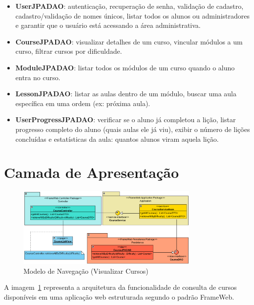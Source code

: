 \begin{itemize}
	\item \textbf{UserJPADAO}: autenticação, recuperação de senha, validação de cadastro, cadastro/validação de nomes únicos, listar todos os alunos ou administradores e garantir que o usuário está acessando a área administrativa.
	
	\item \textbf{CourseJPADAO}: visualizar detalhes de um curso, vincular módulos a um curso, filtrar cursos por dificuldade.
	
	\item \textbf{ModuleJPADAO}: listar todos os módulos de um curso quando o aluno entra no curso.
	
	\item \textbf{LessonJPADAO}: listar as aulas dentro de um módulo, buscar uma aula específica em uma ordem (ex: próxima aula).
	
	\item \textbf{UserProgressJPADAO}: verificar se o aluno já completou a lição, listar progresso completo do aluno (quais aulas ele já viu), exibir o número de lições concluídas e estatísticas da aula: quantos alunos viram aquela lição.
\end{itemize}

\section{Camada de Apresentação}
\label{sec-frameweb-apresentacao}


\begin{figure}[h]
	\centering
	\includegraphics[width=0.8\textwidth]{figuras/visualizarCursos.png}
	\caption{Modelo de Navegação (\textsf{Visualizar Cursos})}
	\label{visualizarCursos}
\end{figure}

A imagem~\ref{visualizarCursos} representa a arquitetura da funcionalidade de consulta de cursos disponíveis em uma aplicação web estruturada segundo o padrão \textsf{FrameWeb}.

